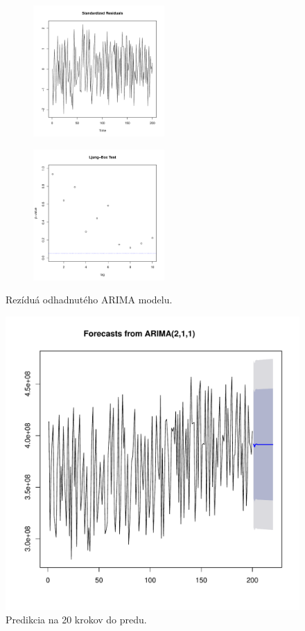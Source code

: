 \documentclass[12pt,a4paper,oneside,final]{article}
\theoremstyle{definition}
\theoremstyle{remark}
\numberwithin{equation}{section}
\begin{document}
\begin{figure}[!tbo] \centering
    \begin{subfigure}[b]{0.55\textwidth}
        \centering
        \includegraphics[width=1\linewidth,height=5cm]{images/heap_resid.pdf}
        \label{obr:heap_resid_resid}
    \end{subfigure}
    \begin{subfigure}[b]{0.55\textwidth}
        \centering
        \includegraphics[width=1\linewidth,height=5cm]{images/heap_box.pdf}
        \label{obr:heap_resid_ljung}
    \end{subfigure}
    \caption{Rezíduá odhadnutého ARIMA modelu.}
    \label{obr:heap_resid}
\end{figure}

\begin{figure}[htb] \centering
    \includegraphics[width=.8\textwidth]{images/heap_forecast.pdf}
    \caption{Predikcia na 20 krokov do predu.}
    \label{obr:heap_forecast}
\end{figure}
\end{document}

